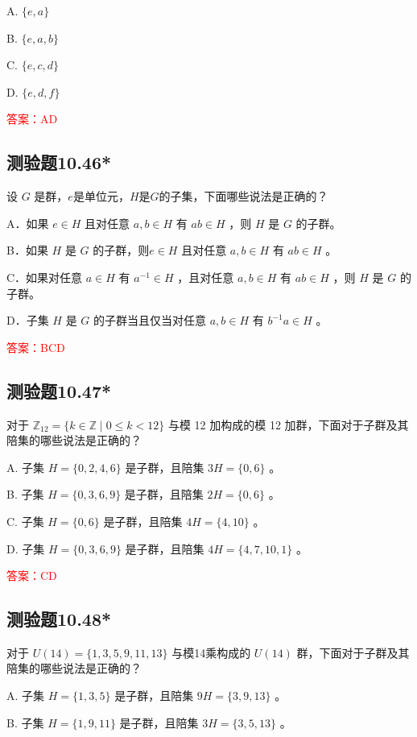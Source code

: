 \documentclass[UTF8, heading=true]{ctexart}
\begin{document}
A. $\{e, a\}$

B. $\{e, a, b\}$

C. $\{e, c, d\}$

D. $\{e, d, f\}$

\textcolor{red}{答案：AD}

\subsection{测验题10.46*}

设 $G$ 是群，$e$是单位元，$H$是$G$的子集，下面哪些说法是正确的？

A．如果 $e \in H$ 且对任意 $a, b \in H$ 有 $a b \in H$ ，则 $H$ 是 $G$ 的子群。

B．如果 $H$ 是 $G$ 的子群，则$e \in H$ 且对任意 $a, b \in H$ 有 $a b \in H$ 。

C．如果对任意 $a \in H$ 有 $a^{-1} \in H$ ，且对任意 $a, b \in H$ 有 $a b \in H$ ，则 $H$ 是 $G$ 的子群。

D．子集 $H$ 是 $G$ 的子群当且仅当对任意 $a, b \in H$ 有 $b^{-1} a \in H$ 。

\textcolor{red}{答案：BCD}

\subsection{测验题10.47*}

对于 $\mathbb{Z}_{12}=\{k \in \mathbb{Z} \mid 0 \leq k<12\}$ 与模 12 加构成的模 12 加群，下面对于子群及其陪集的哪些说法是正确的？

A. 子集 ${H}=\{0,2,4,6\}$ 是子群，且陪集 $3 {H}=\{0,6\}$ 。

B. 子集 ${H}=\{0,3,6,9\}$ 是子群，且陪集 $2 {H}=\{0,6\}$ 。

C. 子集 $H=\{0,6\}$ 是子群，且陪集 $4 {H}=\{4,10\}$ 。

D. 子集 ${H}=\{0,3,6,9\}$ 是子群，且陪集 $4 {H}=\{4,7,10,1\}$ 。

\textcolor{red}{答案：CD}

\subsection{测验题10.48*}

对于 ${U}(14)=\{1,3,5,9,11,13\}$ 与模14乘构成的 $U(14)$ 群，下面对于子群及其陪集的哪些说法是正确的？

A. 子集 ${H}=\{1,3,5\}$ 是子群，且陪集 $9 {H}=\{3,9,13\}$ 。

B. 子集 $H=\{1,9,11\}$ 是子群，且陪集 $3 H=\{3,5,13\}$ 。
\end{document}
